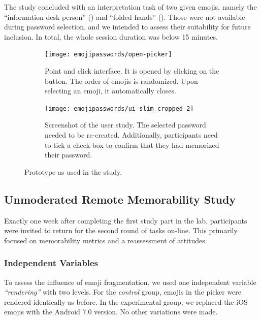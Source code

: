 The study concluded with an interpretation task of two given emojis, namely the ``information desk person'' () and ``folded hands'' (). Those were not available during password selection, and we intended to assess their suitability for future inclusion. In total, the whole session duration was below 15 minutes.

\begin{figure}
	\centering
	\begin{subfigure}[t]{0.49\textwidth}
		\texttt{[image: emojipasswords/open-picker]}
		\caption{\label{fig:emojipasswords:ui-open-picker} Point and click interface. It is opened by clicking on the  button. The order of emojis is randomized. Upon selecting an emoji, it automatically closes.}
	\end{subfigure}
	\begin{subfigure}[t]{0.49\textwidth}
		\texttt{[image: emojipasswords/ui-slim\_cropped-2]}
		\caption{\label{fig:emojipasswords:policy-memo-instruction} Screenshot of the user study. The selected password needed to be re-created. Additionally, participants need to tick a check-box to confirm that they had memorized their password.}
	\end{subfigure}
	\caption{\label{fig:emojipasswords:prototype} Prototype as used in the study.}
\end{figure}

\subsection{Unmoderated Remote Memorability Study}
Exactly one week after completing the first study part in the lab, participants were invited to return for the second round of tasks on-line. This primarily focused on memorability metrics and a reassessment of attitudes. 
\subsubsection{Independent Variables}
To assess the influence of emoji fragmentation, we used one independent variable \textit{``rendering''} with two levels. For the \textit{control} group, emojis in the picker were rendered identically as before. In the experimental group, we replaced the iOS emojis with the Android 7.0 version. No other variations were made. 
